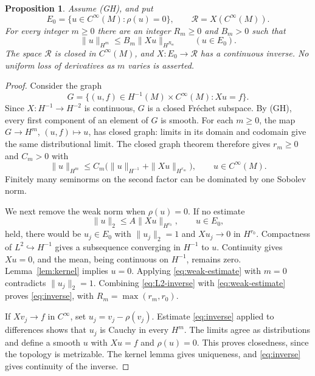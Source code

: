 \documentclass[11pt]{article}
\newtheorem{proposition}[theorem]{Proposition}
\theoremstyle{definition}
\theoremstyle{remark}
\newcommand{\calR}{\mathcal R}
\begin{document}
\begin{proposition}\label{prop:range}
Assume (GH), and put
\[
 E_0=\{u\in C^\infty(M):\rho(u)=0\},\qquad
 \calR=X(C^\infty(M)).
\]
For every integer $m\ge0$ there are an integer $R_m\ge0$ and $B_m>0$ such that
\begin{equation}\label{eq:inverse}
 \|u\|_{H^m}\le B_m\|Xu\|_{H^{R_m}}
 \qquad (u\in E_0).
\end{equation}
The space $\calR$ is closed in $C^\infty(M)$, and $X:E_0\to\calR$ has a continuous inverse. No uniform loss of derivatives as $m$ varies is asserted.
\end{proposition}
\begin{proof}
Consider the graph
\[
 G=\{(u,f)\in H^{-1}(M)\times C^\infty(M):Xu=f\}.
\]
Since $X:H^{-1}\to H^{-2}$ is continuous, $G$ is a closed Fr\'echet subspace. By (GH), every first component of an element of $G$ is smooth. For each $m\ge0$, the map $G\to H^m$, $(u,f)\mapsto u$, has closed graph: limits in its domain and codomain give the same distributional limit. The closed graph theorem therefore gives $r_m\ge0$ and $C_m>0$ with
\begin{equation}\label{eq:weak-estimate}
 \|u\|_{H^m}\le C_m\big(\|u\|_{H^{-1}}+\|Xu\|_{H^{r_m}}\big),
 \qquad u\in C^\infty(M).
\end{equation}
Finitely many seminorms on the second factor can be dominated by one Sobolev norm.

We next remove the weak norm when $\rho(u)=0$. If no estimate
\begin{equation}\label{eq:L2-inverse}
 \|u\|_2\le A\|Xu\|_{H^{r_0}},\qquad u\in E_0,
\end{equation}
held, there would be $u_j\in E_0$ with $\|u_j\|_2=1$ and $Xu_j\to0$ in $H^{r_0}$. Compactness of $L^2\hookrightarrow H^{-1}$ gives a subsequence converging in $H^{-1}$ to $u$. Continuity gives $Xu=0$, and the mean, being continuous on $H^{-1}$, remains zero. Lemma~\ref{lem:kernel} implies $u=0$. Applying \eqref{eq:weak-estimate} with $m=0$ contradicts $\|u_j\|_2=1$. Combining \eqref{eq:L2-inverse} with \eqref{eq:weak-estimate} proves \eqref{eq:inverse}, with $R_m=\max(r_m,r_0)$.

If $Xv_j\to f$ in $C^\infty$, set $u_j=v_j-\rho(v_j)$. Estimate \eqref{eq:inverse} applied to differences shows that $u_j$ is Cauchy in every $H^m$. The limits agree as distributions and define a smooth $u$ with $Xu=f$ and $\rho(u)=0$. This proves closedness, since the topology is metrizable. The kernel lemma gives uniqueness, and \eqref{eq:inverse} gives continuity of the inverse.
\end{proof}
\end{document}
